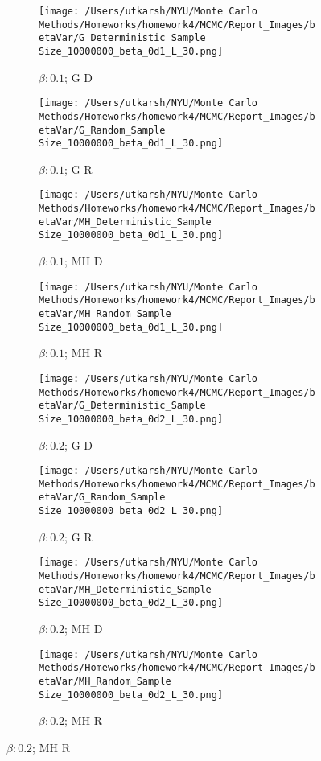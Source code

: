 \documentclass[11pt]{article}
\begin{document}
\begin{figure}[H]
	\centering
	\begin{subfigure}{.23\textwidth}
		\texttt{[image: /Users/utkarsh/NYU/Monte Carlo Methods/Homeworks/homework4/MCMC/Report\_Images/betaVar/G\_Deterministic\_Sample Size\_10000000\_beta\_0d1\_L\_30.png]}
		\caption{$\beta: 0.1$; G D}
	\end{subfigure}
	\begin{subfigure}{.23\textwidth}
		\texttt{[image: /Users/utkarsh/NYU/Monte Carlo Methods/Homeworks/homework4/MCMC/Report\_Images/betaVar/G\_Random\_Sample Size\_10000000\_beta\_0d1\_L\_30.png]}
		\caption{$\beta: 0.1$; G R}
	\end{subfigure}
	\begin{subfigure}{.23\textwidth}
		\texttt{[image: /Users/utkarsh/NYU/Monte Carlo Methods/Homeworks/homework4/MCMC/Report\_Images/betaVar/MH\_Deterministic\_Sample Size\_10000000\_beta\_0d1\_L\_30.png]}
		\caption{$\beta: 0.1$; MH D}
	\end{subfigure}
	\begin{subfigure}{.23\textwidth}
		\texttt{[image: /Users/utkarsh/NYU/Monte Carlo Methods/Homeworks/homework4/MCMC/Report\_Images/betaVar/MH\_Random\_Sample Size\_10000000\_beta\_0d1\_L\_30.png]}
		\caption{$\beta: 0.1$; MH R}
	\end{subfigure}

	\begin{subfigure}{.23\textwidth}
		\texttt{[image: /Users/utkarsh/NYU/Monte Carlo Methods/Homeworks/homework4/MCMC/Report\_Images/betaVar/G\_Deterministic\_Sample Size\_10000000\_beta\_0d2\_L\_30.png]}
		\caption{$\beta: 0.2$; G D}
	\end{subfigure}
	\begin{subfigure}{.23\textwidth}
		\texttt{[image: /Users/utkarsh/NYU/Monte Carlo Methods/Homeworks/homework4/MCMC/Report\_Images/betaVar/G\_Random\_Sample Size\_10000000\_beta\_0d2\_L\_30.png]}
		\caption{$\beta: 0.2$; G R}
	\end{subfigure}
	\begin{subfigure}{.23\textwidth}
		\texttt{[image: /Users/utkarsh/NYU/Monte Carlo Methods/Homeworks/homework4/MCMC/Report\_Images/betaVar/MH\_Deterministic\_Sample Size\_10000000\_beta\_0d2\_L\_30.png]}
		\caption{$\beta: 0.2$; MH D}
	\end{subfigure}
	\begin{subfigure}{.23\textwidth}
		\texttt{[image: /Users/utkarsh/NYU/Monte Carlo Methods/Homeworks/homework4/MCMC/Report\_Images/betaVar/MH\_Random\_Sample Size\_10000000\_beta\_0d2\_L\_30.png]}
		\caption{$\beta: 0.2$; MH R}
	\end{subfigure}


\end{figure}
\end{document}
